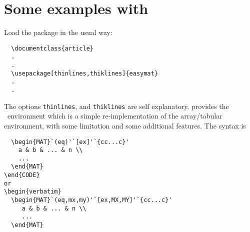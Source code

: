 \documentclass[a4paper]{article}
\begin{document}
\section{Some examples with }
Load the package in the usual way:
\begin{verbatim}
  \documentclass{article}
  .
  .
  \usepackage[thinlines,thiklines]{easymat}
  .
  .
\end{verbatim}
%
The options \texttt{thinlines}, and \texttt{thiklines} are self explanatory.
 provides the ~environment which is a
simple re-implementation of the
array/tabular environment, with some limitation and some additional features.
The syntax is
%
\begin{verbatim}
  \begin{MAT}`(eq)'`[ex]'`{cc...c}'
    a & b & ... & n \\
    ...
  \end{MAT}
\end{CODE} 
or
\begin{verbatim}
  \begin{MAT}`(eq,mx,my)'`[ex,MX,MY]'`{cc...c}'
     a & b & ... & n \\
     ...
  \end{MAT}
\end{verbatim}
%
\end{document}
